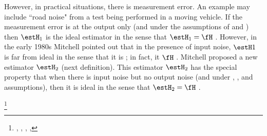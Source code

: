 However, in practical situations, there is measurement error. An example may include 
``road noise" from a test being performed in a moving vehicle.
If the measurement error is at the output only (and under the assumptions of  and )
then $\estH_1$ is the ideal estimator in the sense that $\estH_1=\fH$ .
However, in the early 1980s Mitchell pointed out that in the presence of input noise,
$\estH1$ is far from ideal in the sense that it is ;
in fact, it  $\fH$ .
Mitchell proposed a new estimator $\estH_2$ (next definition).
This estimator $\estH_2$ has the special property that when there is input noise but no 
output noise (and under , , and  assumptions), 
then it is ideal in the sense that $\estH_2=\fH$ .
\begin{definition}
\footnote{
  ,
  ,
  ,
  ,
  }
\label{def:H2}
\end{definition}

